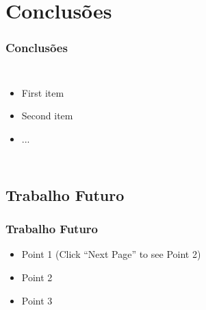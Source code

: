 \documentclass[]{beamer}
\begin{document}
\section{Conclusões}

\begin{frame}
  \frametitle{Conclusões}   %
  \begin{columns}[c]
  \column{2in}  %
  \begin{itemize}
  \item<1-> First item
  \item<2-> Second item
  \item<3-> ...
  \end{itemize}
  \column{2in}
  \end{columns}
\end{frame}

\subsection{Trabalho Futuro}

\begin{frame}
  \frametitle{Trabalho Futuro}   %

  \begin{itemize}
  \item<1-> Point 1 (Click ``Next Page'' to see Point 2) %
  \item<2-> Point 2  %
  \item<3-> Point 3
  \end{itemize}
\end{frame}
\end{document}
